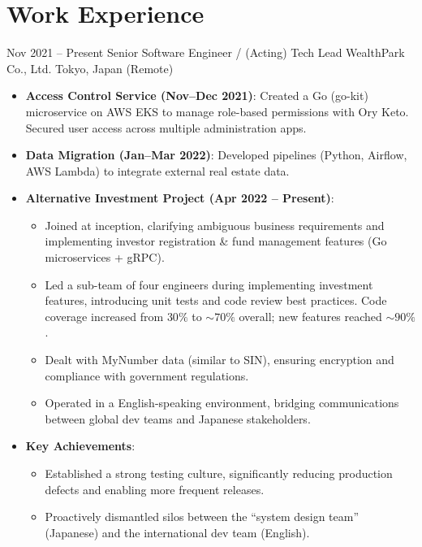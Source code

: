 \documentclass[11pt,letterpaper]{moderncv}
\begin{document}
\section{Work Experience}
\cventry
    {Nov 2021 -- Present}
    {Senior Software Engineer / (Acting) Tech Lead}
    {WealthPark Co., Ltd.}
    {Tokyo, Japan (Remote)}
    {}
    {
      \begin{itemize}
        \item \textbf{Access Control Service (Nov--Dec 2021)}:
        Created a Go (go-kit) microservice on AWS EKS to manage role-based permissions with Ory Keto.
        Secured user access across multiple administration apps.
        \item \textbf{Data Migration (Jan--Mar 2022)}:
        Developed pipelines (Python, Airflow, AWS Lambda) to integrate external real estate data.
        \item \textbf{Alternative Investment Project (Apr 2022 -- Present)}:
        \begin{itemize}
          \item Joined at inception, clarifying ambiguous business requirements and implementing investor registration \& fund management features (Go microservices + gRPC).
          \item Led a sub-team of four engineers during implementing investment features, introducing unit tests and code review best practices. Code coverage increased from $30\%$ to $\sim 70\%$ overall; new features reached $\sim90\%$.
          \item Dealt with MyNumber data (similar to SIN), ensuring encryption and compliance with government regulations.
          \item Operated in a English-speaking environment, bridging communications between global dev teams and Japanese stakeholders.
        \end{itemize}
        \item \textbf{Key Achievements}:
        \begin{itemize}
          \item Established a strong testing culture, significantly reducing production defects and enabling more frequent releases.
          \item Proactively dismantled silos between the “system design team” (Japanese) and the international dev team (English).
        \end{itemize}
      \end{itemize}
    }
\end{document}
